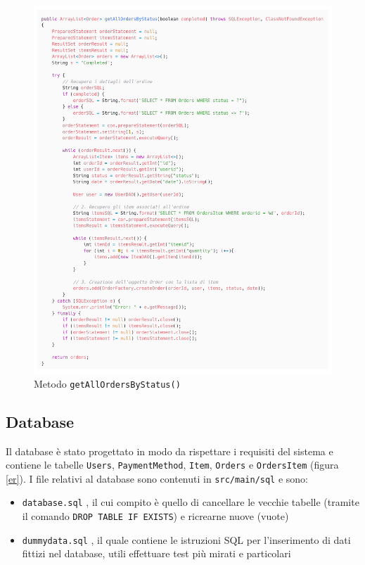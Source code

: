 \documentclass{article}
\begin{document}
\begin{figure}[!h]
    \includegraphics[width=1.0\linewidth]{imgs/snippets/Code_GetAllOrdersByStatus.png}
    \caption{Metodo \texttt{getAllOrdersByStatus()}}
    \label{code_GetAllOrdersByStatus}
\end{figure}

\clearpage

\subsection{Database}
Il database è stato progettato in modo da rispettare i requisiti del sistema e contiene le tabelle \texttt{Users}, \texttt{PaymentMethod}, \texttt{Item}, \texttt{Orders} e \texttt{OrdersItem} (figura \ref{er}).
I file relativi al database sono contenuti in \texttt{src/main/sql} e sono:
\begin{itemize}
    \item {\texttt{database.sql}} , il cui compito è quello di cancellare le vecchie tabelle (tramite il comando \texttt{DROP TABLE IF EXISTS}) e ricrearne nuove (vuote)

    \item \texttt{dummydata.sql} , il quale contiene le istruzioni SQL per l'inserimento di dati fittizi nel database, utili effettuare test più mirati e particolari
\end{itemize}
\end{document}
